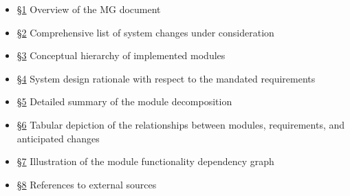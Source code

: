 \documentclass[12pt, titlepage]{article}
\begin{document}
        \begin{itemize}
            \item[] \hyperref[SecIntro]{\S1} Overview of the MG document
            \item[] \hyperref[SecChange]{\S2} Comprehensive list of system changes under consideration
            \item[] \hyperref[SecMH]{\S3} Conceptual hierarchy of implemented modules
            \item[] \hyperref[SecConnection]{\S4} System design rationale with respect to the mandated requirements
            \item[] \hyperref[SecMD]{\S5} Detailed summary of the module decomposition 
            \item[] \hyperref[SecTM]{\S6} Tabular depiction of the relationships between modules, requirements, and anticipated changes
            \item[] \hyperref[SecUse]{\S7} Illustration of the module functionality dependency graph
            \item[] \hyperref[SecRef]{\S8} References to external sources
        \end{itemize}
\end{document}
